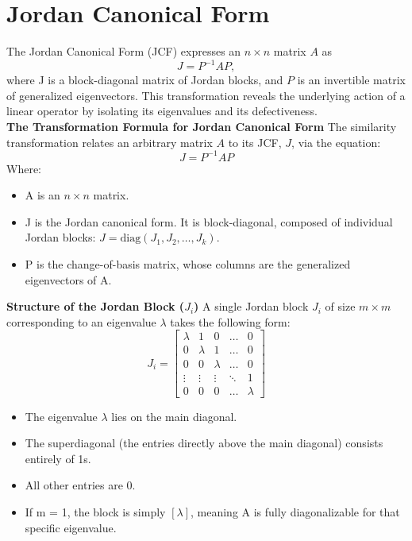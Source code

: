 \section{Jordan Canonical Form}

The Jordan Canonical Form (JCF) expresses an 
$n \times n$ matrix $A$ as \[J = P^{-1}AP,\] where J is a block-diagonal matrix of Jordan blocks, and $P$ is an invertible matrix of generalized eigenvectors. 
This transformation reveals the underlying action of a linear operator by isolating its eigenvalues and its defectiveness.\\

{\bf The Transformation Formula for Jordan Canonical Form} 
The similarity transformation relates an arbitrary matrix $A$ to its JCF, $J$, via the equation:
\[ J = P^{-1}AP \]
Where:
\begin{itemize}
\item[] A is an $n \times n$ matrix.
\item[]J is the Jordan canonical form. It is block-diagonal, composed of individual Jordan blocks:  \(J = \text{diag}(J_1, J_2, \dots, J_k)\).
\item[]P is the change-of-basis matrix, whose columns are the generalized eigenvectors of A.
\end{itemize}

{\bf Structure of the Jordan Block (\(J_{i}\))}
A single Jordan block \(J_{i}\) of size $m \times m$ corresponding to an eigenvalue $\lambda$ takes the following form:
\[J_i = \begin{bmatrix} \lambda & 1 & 0 & \dots & 0 \\
0 & \lambda & 1 & \dots & 0 \\ 
0 & 0 & \lambda & \dots & 0 \\ 
\vdots & \vdots & \vdots & \ddots & 1 \\ 
0 & 0 & 0 & \dots & \lambda \end{bmatrix}
\]
\begin{itemize}
\item[]The eigenvalue $\lambda$ lies on the main diagonal.
\item[]The superdiagonal (the entries directly above the main diagonal) consists entirely of 1s.
\item[]All other entries are 0.
\item[]If m = 1, the block is simply \([\lambda]\), meaning A is fully diagonalizable for that specific eigenvalue.
\end{itemize}

